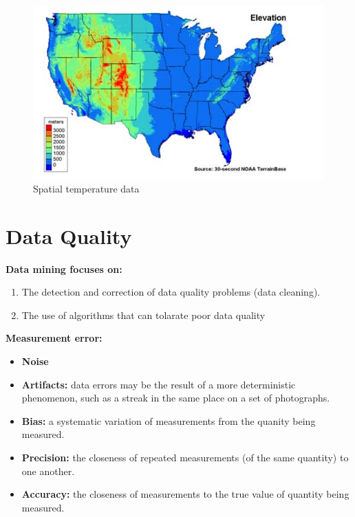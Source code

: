 		\begin{figure}[H]
			\centering
			\includegraphics[scale=0.5]{pics/spatialTemp.jpg}
			\caption{Spatial temperature data}
		\end{figure}


\section{Data Quality}
	
	{\bf Data mining focuses on:}
	\begin{enumerate}
		\item The detection and correction of data quality problems (data cleaning).
		\item The use of algorithms that can tolarate poor data quality
	\end{enumerate}

	{\bf Measurement error:}
		\begin{itemize}
			\item {\bf Noise}
			\item {\bf Artifacts:} data errors may be the result of a more deterministic
			phenomenon, such as a streak in the same place on a set of photographs.
			\item {\bf Bias:} a systematic variation of measurements from the quanity
			being measured. 
			\item {\bf Precision:} the closeness of repeated measurements (of the
			same quantity) to one another.
			\item {\bf Accuracy:} the closeness of measurements to the true value
			of quantity being measured.
		\end{itemize}

